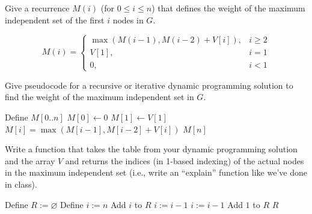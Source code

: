 \begin{questions}
	\question[3] Give a recurrence $M(i)$ (for $0 \le i \le n$) that defines the weight of the maximum independent set of the first $i$ nodes in $G$.

	\ifsolutions\fi

	\begin{soln}
		\[
			M(i) =
			\begin{cases}
				\max(M(i - 1), M(i - 2) + V[i]), & i \geq 2 \\
				V[1],                            & i = 1    \\
				0,                               & i < 1
			\end{cases}
		\]
	\end{soln}

	\question[5] Give pseudocode for a recursive or iterative dynamic programming solution to find the weight of the maximum independent set in $G$.

	\ifsolutions\fi
	\begin{soln}
		\begin{algorithmic}[1]
			\State {}
			\EndIf
			\State Define $M[0..n]$
			\State  $M[0] \gets 0$
			\State  $M[1] \gets V[1]$
			\State $M[i] = \max(M[i - 1], M[i-2] + V[i])$
			\EndFor
			\State \Return $M[n]$
			\EndProcedure
		\end{algorithmic}

	\end{soln}

	\question[4] Write a function that takes the table from your dynamic programming solution and the array $V$ and returns the indices (in 1-based indexing) of the actual nodes in the maximum independent set (i.e., write an ``explain'' function like we've done in class).

	\ifsolutions\fi
	\begin{soln}
		\begin{algorithmic}[1]
			\Procedure{explain}{$V, W, n$}
			\State Define $R := \varnothing$
			\State Define $i := n$
			\While{$i > 3$}
			\If {$M[i] == M[i - 2] + V[i]$}
			\State Add $i$ to $R$
			\State $i := i - 1$
			\EndIf
			\State $i := i - 1$
			\EndWhile
			\If{$i = 1$}
			\State Add $1$ to $R$
			\EndIf
			\State \Return $R$
			\EndProcedure
		\end{algorithmic}
	\end{soln}


\end{questions}
